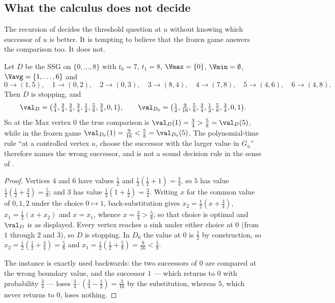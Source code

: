 \subsection{What the calculus does not decide}

The recursion of  decides the threshold question at
$u$ without knowing which successor of $u$ is better. It is tempting to
believe that the frozen game answers the comparison too. It does not.

\begin{proposition}\label{prop:bv-rule}
Let $D$ be the SSG on $\{0,\dots,8\}$ with $t_0=7$, $t_1=8$,
$\Vmax=\{0\}$, $\Vmin=\emptyset$, $\Vavg=\{1,\dots,6\}$ and
\[
 0\to(1,5),\quad 1\to(0,2),\quad 2\to(0,3),\quad 3\to(8,4),\quad
 4\to(7,8),\quad 5\to(4,6),\quad 6\to(4,8).
\]
Then $D$ is stopping, and
\[
 \val_D=\bigl(\tfrac34,\tfrac34,\tfrac34,\tfrac34,\tfrac12,\tfrac58,\tfrac34,0,1\bigr),
 \qquad
 \val_{D_0}=\bigl(\tfrac12,\tfrac9{16},\tfrac58,\tfrac34,\tfrac12,\tfrac58,\tfrac34,0,1\bigr).
\]
So at the Max vertex $0$ the true comparison is
$\val_D(1)=\tfrac34>\tfrac58=\val_D(5)$, while in the frozen game
$\val_{D_0}(1)=\tfrac9{16}<\tfrac58=\val_{D_0}(5)$. The polynomial-time
rule ``at a controlled vertex $u$, choose the successor with the larger
value in $G_u$'' therefore names the wrong successor, and is not a sound
decision rule in the sense of .
\end{proposition}

\begin{proof}
Vertices $4$ and $6$ have values $\tfrac12$ and
$\tfrac12(\tfrac12+1)=\tfrac34$, so $5$ has value
$\tfrac12(\tfrac12+\tfrac34)=\tfrac58$; and $3$ has value
$\tfrac12(1+\tfrac12)=\tfrac34$. Writing $x$ for the common value of
$0,1,2$ under the choice $0\mapsto1$, back-substitution gives
$x_2=\tfrac12(x+\tfrac34)$, $x_1=\tfrac12(x+x_2)$ and $x=x_1$, whence
$x=\tfrac34>\tfrac58$; so that choice is optimal and $\val_D$ is as
displayed. Every vertex reaches a sink under either choice at $0$ (from
$1$ through $2$ and $3$), so $D$ is stopping. In $D_0$ the value at $0$ is
$\tfrac12$ by construction, so $x_2=\tfrac12(\tfrac12+\tfrac34)=\tfrac58$
and $x_1=\tfrac12(\tfrac12+\tfrac58)=\tfrac9{16}<\tfrac58$.

The instance is exactly  used backwards: the two
successors of $0$ are compared at the wrong boundary value, and the
successor $1$ --- which returns to $0$ with probability $\tfrac34$ ---
loses $\tfrac34\cdot(\tfrac34-\tfrac12)=\tfrac3{16}$ by the substitution,
whereas $5$, which never returns to $0$, loses nothing.
\end{proof}

